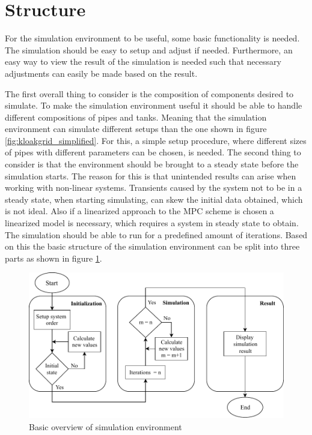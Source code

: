 \section{Structure}\label{sec:Structure}
For the simulation environment to be useful, some basic functionality is needed. The simulation should be easy to setup and adjust if needed. 
Furthermore, an easy way to view the result of the simulation is needed such that necessary adjustments can easily be made based on the result.

The first overall thing to consider is the composition of components desired to simulate. 
To make the simulation environment useful it should be able to handle different compositions of pipes and tanks. Meaning that the simulation environment can simulate different setups than the one shown in figure \ref{fig:kloakgrid_simplified}. For this, a simple setup procedure, where different sizes of pipes with different parameters can be chosen, is needed. 
The second thing to consider is that the environment should be brought to a steady state before the simulation starts. The reason for this is that unintended results can arise when working with non-linear systems. Transients caused by the system not to be in a steady state, when starting simulating, can skew the initial data obtained, which is not ideal.   
Also if a linearized approach to the MPC scheme is chosen a linearized model is necessary, which requires a system in steady state to obtain. 
The simulation should be able to run for a predefined amount of iterations. 
Based on this the basic structure of the simulation environment can be split into three parts as shown in figure \ref{fig:struct_overview}.

\begin{figure}[H]
\centering
\includegraphics[width=0.9 \textwidth]{report/simulation/pictures/struct_overview_v2.pdf}
\caption{Basic overview of simulation environment}
\label{fig:struct_overview}
\end{figure}


